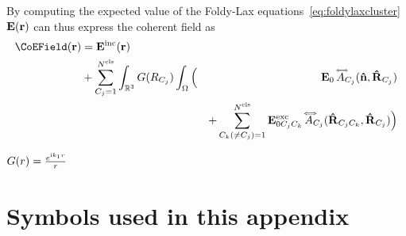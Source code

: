 By computing the expected value of the Foldy-Lax equations~\eqref{eq:foldylaxcluster} $\mathbf{E}(\mathbf{r})$ can thus express the coherent field as 
\begin{align}
\CoEField(\px) & = \IncEField(\px) & \\ 
& +  \sum_{{\Cls_j}=1}^\Ncls \int_{\Real^3} G(\tPx_{\Cls_j}) \int_\Omega \Big( & \EField_0 \,  \ScaDyad_{\Cls_j}(\dw,\dPx_{\Cls_j}) \\ & & + \sum_{{\Cls_k}(\neq{\Cls_j})=1}^\Ncls \ExcEField_{0{\Cls_j} {\Cls_k}} \, \ScaDyad_{\Cls_j}(\dPx_{{\Cls_j}{\Cls_k}},\dPx_{\Cls_j}) \Big)
\end{align}

$G(r) = \frac{e^{\text{i} k_1 r}}{r}$

\section{Symbols used in this appendix}
